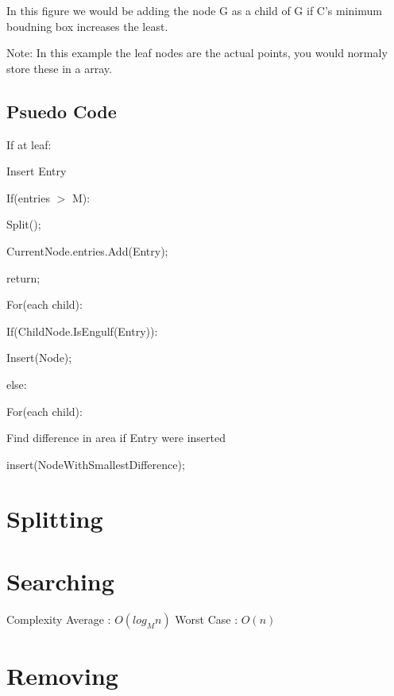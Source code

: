 \documentclass{article}
\begin{document}
In this figure we would be adding the node G as a child of G
if C's minimum boudning box increases the least.

Note: In this example the leaf nodes are the actual points, you would normaly store these in a array.
\subsection*{Psuedo Code}
\begin{flushleft}
    
If at leaf:

\quad Insert Entry

\quad If(entries $>$ M):

\quad \quad Split();

\quad CurrentNode.entries.Add(Entry);

\quad return;


For(each child):


\quad If(ChildNode.IsEngulf(Entry)):

 \quad \quad Insert(Node);


else:

\quad For(each child):

    \quad \quad
    Find difference in area if Entry were inserted

    \quad insert(NodeWithSmallestDifference);
\end{flushleft}

\section{Splitting} 

\section{Searching}
Complexity
Average : $O(log_Mn)$
Worst Case : $O(n)$

\section{Removing}
\end{document}
